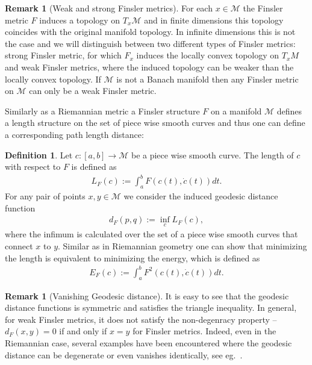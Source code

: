 \documentclass[11pt]{amsart}
\theoremstyle{definition}
\newtheorem{definition}[theorem]{Definition}
\newtheorem{remark}[theorem]{Remark}
\begin{document}
\begin{remark}[Weak and strong Finsler metrics]
For each $x\in \mathcal M$ the Finsler metric $F$ induces a topology on $T_x \mathcal M$ and in finite dimensions this topology coincides with the original manifold topology. In infinite dimensions this is not the case and we will distinguish between two different types of Finsler metrics:  strong Finsler metric, for which $F_{x}$ induces the locally convex topology on $T_x M$ and weak Finsler metrics, where the induced topology can be weaker than the locally convex topology.  If $\mathcal M$ is not a Banach manifold then any Finsler metric on $\mathcal M$ can only be a weak Finsler metric.
\end{remark}

Similarly as a Riemannian metric a Finsler structure $F$ on a manifold $\mathcal M$ defines a length structure on the set of piece wise smooth curves and thus one can define a corresponding path length distance:
\begin{definition}
Let $c:[a,b]\to\mathcal M$ be a piece wise smooth curve.
The length of $c$ with respect to $F$ is defined as
\begin{align*}
L_{F}(c):=\int_a^b F(c(t),\dot{c}(t)) dt.
\end{align*}
For any pair of points $x,y\in \mathcal M$ we consider the induced geodesic distance function  
\begin{align*}
d_{F}(p,q):=\operatorname{inf}_{c} L_{F}(c),
\end{align*}
where the infimum is calculated over the set of a piece wise smooth curves that connect $x$ to $y$. Similar as in Riemannian geometry one can show that minimizing the length is equivalent to minimizing the energy, which is defined as
\begin{align}\label{eq:finslerenergy}
E_{F}(c):=\int_a^b F^2(c(t),\dot{c}(t)) dt.
\end{align}
\end{definition}




\begin{remark}[Vanishing Geodesic distance]
It is easy to see that the geodesic distance functions is symmetric and satisfies the triangle inequality. In general, for weak Finsler metrics, it does not satisfy the non-degenracy property -- $d_{F}(x,y)=0$ if and only if $x=y$ for  Finsler metrics. Indeed, even in the Riemannian case, several examples have been encountered where the geodesic distance can be degenerate or even vanishes identically, see eg.~\cite{eliashberg1993bi,michor2005vanishing,bauer2020vanishing,jerrard2019vanishing}. 
\end{remark}
\end{document}
